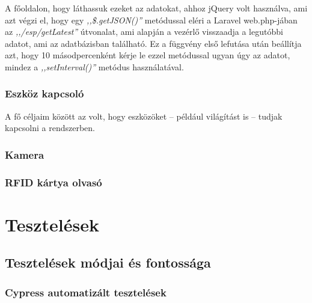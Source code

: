 \documentclass[
]{thesis-ekf}
\theoremstyle{definition}
\theoremstyle{remark}
\begin{document}
	A főoldalon, hogy láthassuk ezeket az adatokat, ahhoz jQuery volt használva, ami azt végzi el, hogy egy \emph{,,\$.getJSON()''} metódussal eléri a Laravel web.php-jában az \emph{,,/esp/getLatest''} útvonalat, ami alapján a vezérlő visszaadja a legutóbbi adatot, ami az adatbázisban található. Ez a függvény első lefutása után beállítja azt, hogy 10 másodpercenként kérje le ezzel metódussal ugyan úgy az adatot, mindez a \emph{,,setInterval()''} metódus használatával.
	
	\subsection{Eszköz kapcsoló}\label{toggle}
	
	A fő céljaim között az volt, hogy eszközöket -- például világítást is -- tudjak kapcsolni a rendszerben. 
	\subsection{Kamera}
	\subsection{RFID kártya olvasó}\label{rfid-working}
	
	
	\chapter{Tesztelések}
	\section{Tesztelések módjai és fontossága}
	
	\subsection{Cypress automatizált tesztelések}
\end{document}
